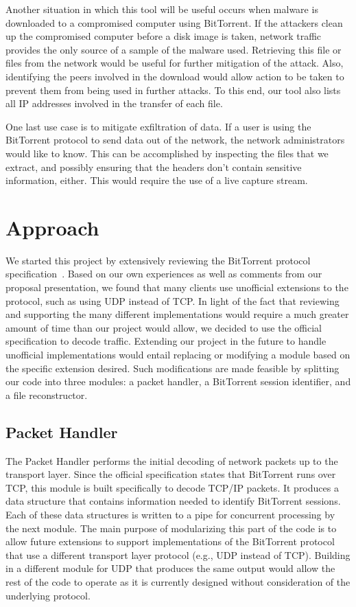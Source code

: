 \documentclass{acm_proc_article-sp}
\begin{document}
Another situation in which this tool will be useful occurs when malware is
downloaded to a compromised computer using BitTorrent. If the attackers clean up
the compromised computer before a disk image is taken, network traffic provides
the only source of a sample of the malware used. Retrieving this file or files
from the network would be useful for further mitigation of the attack. Also,
identifying the peers involved in the download would allow action to be taken to
prevent them from being used in further attacks. To this end, our tool also
lists all IP addresses involved in the transfer of each file.

One last use case is to mitigate exfiltration of data.  If a user is using the
BitTorrent protocol to send data out of the network, the network administrators
would like to know.  This can be accomplished by inspecting the files that we
extract, and possibly ensuring that the headers don't contain sensitive
information, either.  This would require the use of a live capture stream.


\section{Approach}
We started this project by extensively reviewing the BitTorrent protocol
specification~\cite{officialspec}.  Based on our own experiences as well as
comments from our proposal presentation, we found that many clients use
unofficial extensions to the protocol, such as using UDP instead of TCP. In
light of the fact that reviewing and supporting the many different
implementations would require a much greater amount of time than our project
would allow, we decided to use the official specification to decode
traffic. Extending our project in the future to handle unofficial
implementations would entail replacing or modifying a module based on the
specific extension desired. Such modifications are made feasible by splitting
our code into three modules: a packet handler, a BitTorrent session identifier,
and a file reconstructor.

\subsection{Packet Handler}
The Packet Handler performs the initial decoding of network packets up to the
transport layer. Since the official specification states that BitTorrent runs
over TCP, this module is built specifically to decode TCP/IP packets. It
produces a data structure that contains information needed to identify
BitTorrent sessions. Each of these data structures is written to a pipe for
concurrent processing by the next module. The main purpose of modularizing this
part of the code is to allow future extensions to support implementations of the
BitTorrent protocol that use a different transport layer protocol (e.g., UDP
instead of TCP). Building in a different module for UDP that produces the same
output would allow the rest of the code to operate as it is currently designed
without consideration of the underlying protocol.
\end{document}
